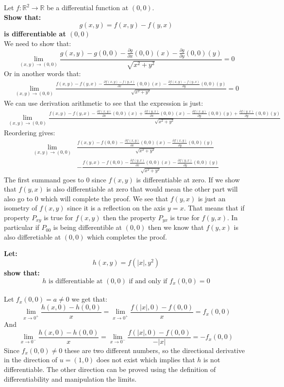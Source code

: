 \documentclass{article}
\theoremstyle{plain}
\newcommand{\R}{\mathbb{R}}
\begin{document}
	Let $f\colon\R^2\to\R$ be a differential function at $(0,0)$. \\
	\textbf{Show that:
	\[
		g(x,y) = f(x,y) - f(y,x)
	\]
	is differentiable at $(0,0)$} \\
	We need to show that:
	\[
		\lim_{(x,y)\to(0,0)}{\frac{g(x,y)-g(0,0)-\frac{\partial g}
		{\partial x}(0,0)(x) - \frac{\partial g}{\partial y}(0,0)
		(y)}{\sqrt{x^2+y^2}}} = 0
	\]
	Or in another words that:
	\begin{align*}
		\lim_{(x,y)\to(0,0)} {\frac{f(x,y) - f(y,x) 
		-\frac{\partial f(x,y) - f(y,x)}
		{\partial x}(0,0)(x) - \frac{\partial f(x,y) - f(y,x)}
		{\partial y}(0,0)(y)}{\sqrt{x^2+y^2}}} = 0
	\end{align*}
	We can use derivation arithmetic to see that the expression is just:
	\begin{align*}
		\lim_{(x,y)\to(0,0)} {
		\frac{f(x,y) - f(y,x) -
		\frac{\partial f(x,y)}{\partial x}(0,0)(x) +
		\frac{\partial f(y,x)}{\partial x}(0,0)(x) - 
		\frac{\partial f(x,y)}{\partial y}(0,0)(y) + 
		\frac{\partial f(y,x)}{\partial y}(0,0)(y)}
		{\sqrt{x^2+y^2}}}
	\end{align*}
	Reordering gives:
	\begin{align*}
		\lim_{(x,y)\to(0,0)} &{
		\frac{
		f(x,y)
		-f(0,0)
		-\frac{\partial f(x,y)}{\partial x}(0,0)(x) 
		-\frac{\partial f(x,y)}{\partial y}(0,0)(y)
		}
		{\sqrt{x^2+y^2}}} \\ & -
		\frac{
		f(y,x)
		-f(0,0)
		-\frac{\partial f(y,x)}{\partial x}(0,0)(x)  
		-\frac{\partial f(y,x)}{\partial y}(0,0)(y)
		}
		{\sqrt{x^2+y^2}}
	\end{align*}
	The first summand goes to $0$ since $f(x,y)$ is differentiable at zero. 
	If we show that $f(y,x)$ is also differentiable at zero that would mean the 
	other  part will also go to $0$ which will complete the proof. We see that 
	$f(y,x)$ is just an isometry of $f(x,y)$ since it is a reflection on the axis
	$y=x$. That means that if property $P_{xy}$ is true for $f(x,y)$ then
	the property $P_{yx}$ is true for $f(y,x)$. In particular if $P_{00}$ is
	being differentible at $(0,0)$ then we know that $f(y,x)$ is also
	differetiable at $(0,0)$ which completes the proof.
	
	\newpage
	
	\textbf{Let:
	\[
		h(x,y) = f(\vert x\vert,y^2)
	\]
	show that: 
	\[
		h \text{ is differentiable at } (0,0) 
		\text{ if and only if }
		f_x(0,0)=0
	\]} \\
	Let $f_x(0,0) = a \neq 0$ we get that:
	\[
		\lim_{x\to 0^+}\frac
		{h(x,0) - h(0,0)}
		{x} = 
		\lim_{x\to 0^+}\frac
		{f(|x|,0) - f(0,0)}
		{x} = f_x(0,0)
	\]
	And
	\[
		\lim_{x\to 0^-}\frac
		{h(x,0) - h(0,0)}
		{x} = 
		\lim_{x\to 0^-}\frac
		{f(|x|,0) - f(0,0)}
		{-|x|} = -f_x(0,0)
	\]
	Since $f_x(0,0) \neq 0$ these are two different numbers,
	so the directional derivative in the direction of $u = (1,0)$ does not
	exist which implies  that $h$ is not differentiable. The other direction
	can be proved using the definition of differentiability and manipulation
	the limits.
	
\end{document}
